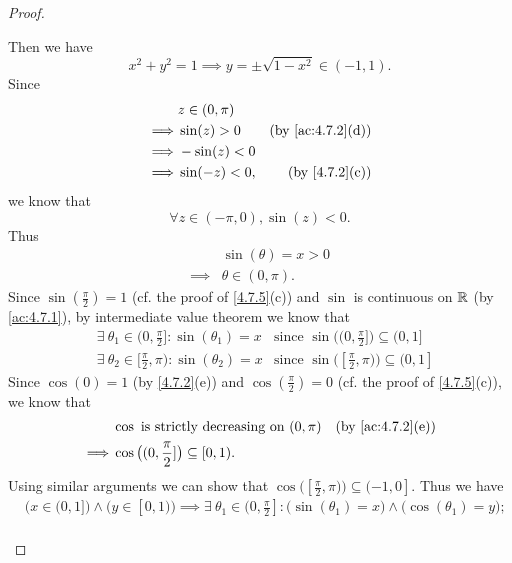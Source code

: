 \begin{proof}
\begin{itemize}
          Then we have
          \[
            x^2 + y^2 = 1 \implies y = \pm \sqrt{1 - x^2} \in (-1, 1).
          \]
          Since
          \begin{align*}
                     & z \in (0, \pi)                                  \\
            \implies & \sin(z) > 0    & \text{(by \cref{ac:4.7.2}(d))} \\
            \implies & -\sin(z) < 0                                    \\
            \implies & \sin(-z) < 0,  & \text{(by \cref{4.7.2}(c))}
          \end{align*}
          we know that
          \[
            \forall z \in (-\pi, 0), \sin(z) < 0.
          \]
          Thus
          \begin{align*}
                     & \sin(\theta) = x > 0 \\
            \implies & \theta \in (0, \pi).
          \end{align*}
          Since \(\sin(\frac{\pi}{2}) = 1\) (cf. the proof of \cref{4.7.5}(c)) and \(\sin\) is continuous on \(\mathbb{R}\) (by \cref{ac:4.7.1}), by intermediate value theorem we know that
          \begin{align*}
             & \exists\ \theta_1 \in (0, \frac{\pi}{2}] : \sin(\theta_1) = x   & \text{since } \sin\big((0, \frac{\pi}{2}]\big) \subseteq (0, 1]   \\
             & \exists\ \theta_2 \in [\frac{\pi}{2}, \pi) : \sin(\theta_2) = x & \text{since } \sin\big([\frac{\pi}{2}, \pi)\big) \subseteq (0, 1]
          \end{align*}
          Since \(\cos(0) = 1\) (by \cref{4.7.2}(e)) and \(\cos(\frac{\pi}{2}) = 0\) (cf. the proof of \cref{4.7.5}(c)), we know that
          \begin{align*}
                     & \cos \text{ is strictly decreasing on } (0, \pi)   & \text{(by \cref{ac:4.7.2}(e))} \\
            \implies & \cos\big((0, \frac{\pi}{2}]\big) \subseteq [0, 1).
          \end{align*}
          Using similar arguments we can show that \(\cos\big([\frac{\pi}{2}, \pi)\big) \subseteq (-1, 0]\).
          Thus we have
          \begin{align*}
             & \big(x \in (0, 1]\big) \land \big(y \in [0, 1)\big) \implies \exists\ \theta_1 \in (0, \frac{\pi}{2}] : \big(\sin(\theta_1) = x\big) \land \big(\cos(\theta_1) = y\big);    \\

\end{align*}
\end{itemize}
\end{proof}
